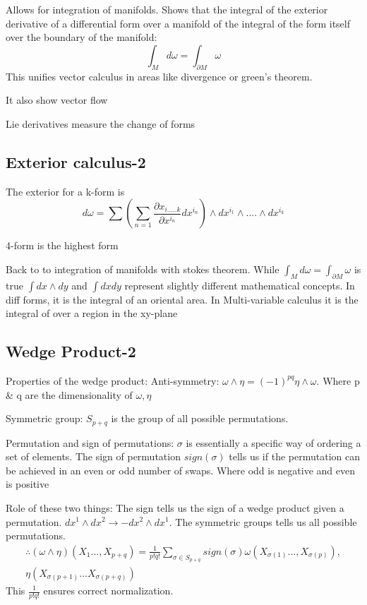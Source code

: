 Allows for integration of manifolds. Shows that the integral of the exterior derivative of a differential form over a manifold of the integral of the form itself over the boundary of the manifold: 
$$\int_M d \omega = \int_{\partial M} \omega$$
This unifies vector calculus in areas like divergence or green's theorem.

It also show vector flow

Lie derivatives measure the change of forms
\subsection{Exterior calculus-2}
The exterior for a k-form is
$$d \omega=\sum  (\sum_{n=1} \frac{\partial x_{i.....k}}{\partial x^{i_n}}dx^{i_n})\wedge dx^{i_1} \wedge .... \wedge  dx^{i_k}$$

4-form is the highest form

Back to to integration of manifolds with stokes theorem.
While $\int_M d \omega = \int_{\partial M} \omega$ is true $\int dx \wedge dy$ and $\int dxdy$ represent slightly different mathematical concepts. In diff forms, it is the integral of an oriental area. In Multi-variable calculus it is the integral of over a region in the xy-plane
\subsection{Wedge Product-2}
Properties of the wedge product:
Anti-symmetry: $\omega \wedge \eta= (-1)^{pq} \eta \wedge \omega$. Where p \& q are the dimensionality of $\omega, \eta$

Symmetric group: $S_{p+q}$ is the group of all possible permutations. 

Permutation and sign of permutations: $\sigma$ is essentially a specific way of ordering a set of elements. The sign of permutation $sign(\sigma)$ tells us if the permutation can be achieved in an even or odd number of swaps.
Where odd is negative and even is positive

Role of these two things: The sign tells us the sign of a wedge product given a permutation. $dx^1 \wedge dx^2\to -dx^2 \wedge dx^1$. The symmetric groups tells us all possible permutations. 
\begin{align*}
    \therefore (\omega \wedge \eta)(X_1..., X_{p+q})=\frac{1}{p!q!}\sum_{\sigma \in S_{p+q}}sign(\sigma)\omega(X_{\sigma(1)}..., X_{\sigma(p)}), \\ \eta(X_{\sigma(p+1)}...X_{\sigma(p+q)})
\end{align*}
This $\frac{1}{p!q!}$ ensures correct normalization.
